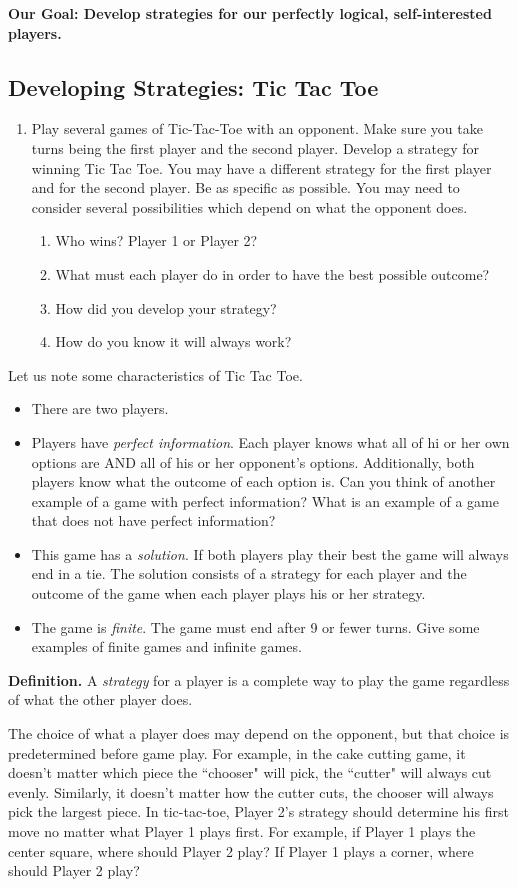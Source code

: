 {\bf Our Goal: Develop strategies for our perfectly logical, self-interested players.}

\subsection{Developing Strategies: Tic Tac Toe}

\begin{enumerate}
\item Play several games of Tic-Tac-Toe with an opponent. Make sure you take turns being the first player and the second player. Develop a strategy for winning Tic Tac Toe. You may have a different strategy for the first player and for the second player. Be as specific as possible. You may need to consider several possibilities which depend on what the opponent does.

\begin{enumerate}
\item Who wins? Player 1 or Player 2?
\item What must each player do in order to have the best possible outcome?
\item How did you develop your strategy?
\item How do you know it will always work?
\end{enumerate}
 
\end{enumerate}

Let us note some characteristics of Tic Tac Toe.
\begin{itemize}
\item There are two players.
\item Players have {\it perfect information}. Each player knows what all of hi or her own options are AND all of his or her opponent's options. Additionally, both players know what the outcome of each option is. Can you think of another  example of a game with perfect information? What is an example of a game that does not have perfect information?
\item This game has a {\it solution}. If both players play their best the game will always end in a tie. The solution consists of a strategy for each player and the outcome of the game when each player plays his or her strategy.
\item The game is {\it finite}. The game must end after 9 or fewer turns. Give some examples of finite games and infinite games.
\end{itemize}

{\bf Definition.} A {\it strategy} for a player is a complete way to play the game regardless of what the other player does. 

The choice of what a player does may depend on the opponent, but that choice is predetermined before game play. For example, in the cake cutting game, it doesn't matter which piece the ``chooser" will pick, the ``cutter" will always cut evenly. Similarly, it doesn't matter how the cutter cuts, the chooser will always pick the largest piece. In tic-tac-toe, Player 2's strategy should determine his first move no matter what Player 1 plays first. For  example, if Player 1 plays the center square, where should Player 2 play? If Player 1 plays a corner, where should Player 2 play?    
